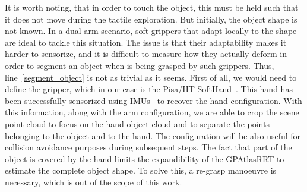 It is worth noting, that in order to touch the object, this must be held such
that it does not move during the tactile exploration. But initially, the object
shape is not known. In a dual arm scenario, soft grippers that adapt locally to
the shape are ideal to tackle this situation. The issue is that their
adaptability makes it harder to sensorize, and it is difficult to measure how
they actually deform in order to segment an object when is being grasped by such
grippers. Thus, line~\ref{segment_object} is not as trivial as it seems. First of
all, we would need to define the gripper, which in our case is the Pisa/IIT
SoftHand~\cite{Catalano2014Adaptive}. This hand has been successfully sensorized
using IMUs~\cite{Santaera2015Lowcost} to recover the hand configuration.
With this information, along with the arm configuration, we are able to crop the
scene point cloud to focus on the hand-object cloud and to separate the
points belonging to the object and to the hand. The configuration
will be also useful for collision avoidance purposes during subsequent steps.
The fact that part of the object is covered by the hand limits the expandibility
of the GPAtlasRRT to estimate the complete object shape. To solve this, a
re-grasp manoeuvre is necessary, which is out of the scope of this work.

